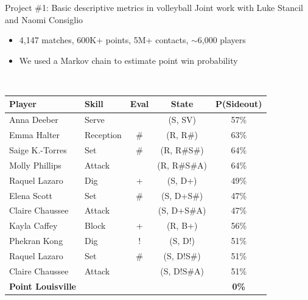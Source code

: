 \documentclass[handout]{beamer}
\begin{document}
\begin{frame}{Project \#1: Basic descriptive metrics in volleyball}
  {Joint work with Luke Stancil and Naomi Consiglio}
  \begin{itemize}
    \item 4,147 matches, 600K+ points, 5M+ contacts, $\sim$6,000 players
    \item We used a Markov chain to estimate point win probability
  \end{itemize}
  ~\\
  \small\centering
  \begin{tabular}{llc|cc}
    \bf Player                      & \bf Skill                 & \bf Eval            & \bf State                   & \bf P(Sideout)\\
    \hline
    \color{red} Anna Deeber         & \color{red} Serve         &                     & \color{red} (S, SV)         & \color{orange} 57\%\\
    \color{orange} Emma Halter      & \color{orange} Reception  & \color{orange} \#   & \color{orange} (R, R\#)     & \color{orange} 63\%\\
    \color{orange} Saige K.-Torres  & \color{orange} Set        & \color{orange} \#   & \color{orange} (R, R\#S\#)  & \color{orange} 64\%\\
    \color{orange} Molly Phillips   & \color{orange} Attack     &                     & \color{orange} (R, R\#S\#A) & \color{orange} 64\%\\
    \color{red} Raquel Lazaro       & \color{red} Dig           & \color{red} +       & \color{red} (S, D+)         & \color{orange} 49\%\\
    \color{red} Elena Scott         & \color{red} Set           & \color{red} \#      & \color{red} (S, D+S\#)      & \color{orange} 47\%\\
    \color{red} Claire Chaussee     & \color{red} Attack        &                     & \color{red} (S, D+S\#A)     & \color{orange} 47\%\\
    \color{orange} Kayla Caffey     & \color{orange} Block      & \color{orange} +    & \color{orange} (R, B+)      & \color{orange} 56\%\\
    \color{red} Phekran Kong        & \color{red} Dig           & \color{red} !       & \color{red} (S, D!)         & \color{orange} 51\%\\
    \color{red} Raquel Lazaro       & \color{red} Set           & \color{red} \#      & \color{red} (S, D!S\#)      & \color{orange} 51\%\\
    \color{red} Claire Chaussee     & \color{red} Attack        &                     & \color{red} (S, D!S\#A)     & \color{orange} 51\%\\
    \hline
    \bf\color{red} Point Louisville &                           &                     &                             & \color{orange} \bf 0\%\\
  \end{tabular}
\end{frame}
\end{document}
